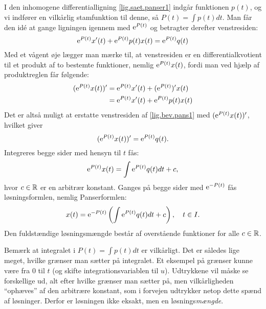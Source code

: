 \begin{bevis} \label{bev.panser1}
I den inhomogene differentialligning \eqref{lig.saet.panser1} indgår funktionen $ p(t) $, og vi indfører en vilkårlig stamfunktion til denne, så $ P(t) = \int p(t)dt $. Man får den idé at gange ligningen igennem med $ \mathrm{e}^{P(t)} $ og betragter derefter venstresiden:
\begin{equation}
\mathrm{e} ^{P(t)} x'(t) + \mathrm{e} ^{P(t)}p(t)x(t) = \mathrm{e} ^{P(t)}q(t) \label{lig.bev.pans1}
\end{equation} 
Med et vågent øje lægger man mærke til, at venstresiden er en differentialkvotient til et produkt af to bestemte funktioner, nemlig $ \mathrm{e} ^{P(t)}x(t) $, fordi man ved hjælp af produktreglen får følgende:
\begin{equation}
\begin{aligned}
(\mathrm{e} ^{P(t)}x(t))' &= \mathrm{e} ^{P(t)}x'(t) + (\mathrm{e} ^{P(t)})'x(t) \\
&= \mathrm{e} ^{P(t)} x'(t) + \mathrm{e} ^{P(t)} p(t) x(t) 
\end{aligned}
\end{equation}
Det er altså muligt at erstatte venstresiden af \eqref{lig.bev.pans1} med $ (\mathrm{e}^{P(t)}x(t))' $, hvilket giver
\begin{equation}
(\mathrm{e}^{P(t)}x(t))' = \mathrm{e}^{P(t)}q(t).
\end{equation}
Integreres begge sider med hensyn til $ t $ fås:
\begin{equation}
\mathrm{e}^{P(t)}x(t) = \int \mathrm{e}^{P(t)}q(t) dt + c, \label{lig.bev.pans2}
\end{equation}
hvor $ c \in \mathbb{R} $ er en arbitrær konstant. Ganges på begge sider med $ \mathrm{e}^{-P(t)} $ fås løsningsformlen, nemlig Panserformlen:
\begin{equation}
x(t) = \mathrm{e} ^{-P(t)} \left( \int \mathrm{e} ^{P(t)}q(t) dt + c \right), \quad t \in I.
\end{equation}
Den fuldstændige løsningsmængde består af overstående funktioner for alle $ c \in \mathbb{R} $.

\begin{info}
Bemærk at integralet i $ P(t) = \int p(t) dt $ er vilkårligt. Det er således lige meget, hvilke grænser man sætter på integralet. Et eksempel på grænser kunne være fra 0 til $ t $ (og skifte integrationsvariablen til $ u $). Udtrykkene vil måske se forskellige ud, alt efter hvilke grænser man sætter på, men vilkårligheden ``ophæves'' af den arbitrære konstant, som i forvejen udtrykker netop dette spænd af løsninger. Derfor er løsningen ikke eksakt, men en løsnings\textit{mængde}.
\end{info}
\end{bevis}

